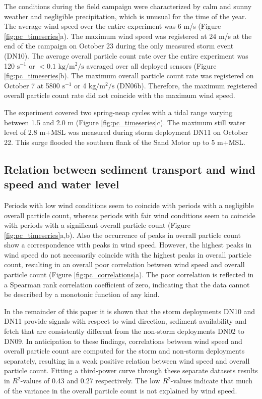 The conditions during the field campaign were characterized by calm
and sunny weather and negligible precipitation, which is unusual for
the time of the year. The average wind speed over the entire
experiment was 6 m/s (Figure \ref{fig:pc_timeseries}a). The maximum
wind speed was registered at 24 m/s at the end of the campaign on
October 23 during the only measured storm event (DN10). The average
overall particle count rate over the entire experiment was 120
$\mathrm{s^{-1}}$ or $< 0.1$ $\mathrm{kg/m^2/s}$ averaged over all
deployed sensors (Figure \ref{fig:pc_timeseries}b). The maximum
overall particle count rate was registered on October 7 at 5800
$\mathrm{s^{-1}}$ or 4 $\mathrm{kg/m^2/s}$ (DN06b). Therefore, the
maximum registered overall particle count rate did not coincide with
the maximum wind speed.

The experiment covered two spring-neap cycles with a tidal range
varying between 1.5 and 2.0 m (Figure \ref{fig:pc_timeseries}c). The
maximum still water level of 2.8 m+MSL was measured during storm
deployment DN11 on October 22. This surge flooded the southern flank
of the Sand Motor up to 5 m+MSL.

\subsection{Relation between sediment transport and wind speed and
  water level}

Periods with low wind conditions seem to coincide with periods with a
negligible overall particle count, whereas periods with fair wind
conditions seem to coincide with periods with a significant overall
particle count (Figure \ref{fig:pc_timeseries}a,b). Also the
occurrence of peaks in overall particle count show a correspondence
with peaks in wind speed. However, the highest peaks in wind speed do
not necessarily coincide with the highest peaks in overall particle
count, resulting in an overall poor correlation between wind speed and
overall particle count (Figure \ref{fig:pc_correlations}a). The poor
correlation is reflected in a Spearman rank correlation coefficient
\citep{Spearman1904} of zero, indicating that the data cannot be
described by a monotonic function of any kind.

In the remainder of this paper it is shown that the storm deployments
DN10 and DN11 provide signals with respect to wind direction, sediment
availability and fetch that are consistently different from the
non-storm deployments DN02 to DN09. In anticipation to these findings,
correlations between wind speed and overall particle count are
computed for the storm and non-storm deployments separately, resulting
in a weak positive relation between wind speed and overall particle
count. Fitting a third-power curve through these separate datasets
results in $R^2$-values of 0.43 and 0.27 respectively. The low
$R^2$-values indicate that much of the variance in the overall
particle count is not explained by wind speed.

